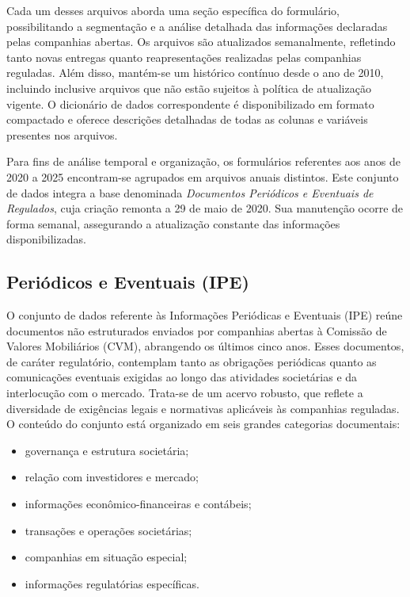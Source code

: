 \documentclass[recuosum=1.5cm]{iftex2024}
\begin{document}
Cada um desses arquivos aborda uma seção específica do formulário, possibilitando a segmentação e a análise detalhada das informações declaradas pelas companhias abertas. Os arquivos são atualizados semanalmente, refletindo tanto novas entregas quanto reapresentações realizadas pelas companhias reguladas. Além disso, mantém-se um histórico contínuo desde o ano de 2010, incluindo inclusive arquivos que não estão sujeitos à política de atualização vigente. O dicionário de dados correspondente é disponibilizado em formato compactado e oferece descrições detalhadas de todas as colunas e variáveis presentes nos arquivos.

Para fins de análise temporal e organização, os formulários referentes aos anos de 2020 a 2025 encontram-se agrupados em arquivos anuais distintos. Este conjunto de dados integra a base denominada \textit{Documentos Periódicos e Eventuais de Regulados}, cuja criação remonta a 29 de maio de 2020. Sua manutenção ocorre de forma semanal, assegurando a atualização constante das informações disponibilizadas.

\subsection{Periódicos e Eventuais (IPE)}

O conjunto de dados referente às Informações Periódicas e Eventuais (IPE) reúne documentos não estruturados enviados por companhias abertas à Comissão de Valores Mobiliários (CVM), abrangendo os últimos cinco anos. Esses documentos, de caráter regulatório, contemplam tanto as obrigações periódicas quanto as comunicações eventuais exigidas ao longo das atividades societárias e da interlocução com o mercado. Trata-se de um acervo robusto, que reflete a diversidade de exigências legais e normativas aplicáveis às companhias reguladas. O conteúdo do conjunto está organizado em seis grandes categorias documentais:

\begin{itemize}
	\item governança e estrutura societária;
	\item relação com investidores e mercado;
	\item informações econômico-financeiras e contábeis;
	\item transações e operações societárias;
	\item companhias em situação especial;
	\item informações regulatórias específicas.
\end{itemize}
\end{document}
